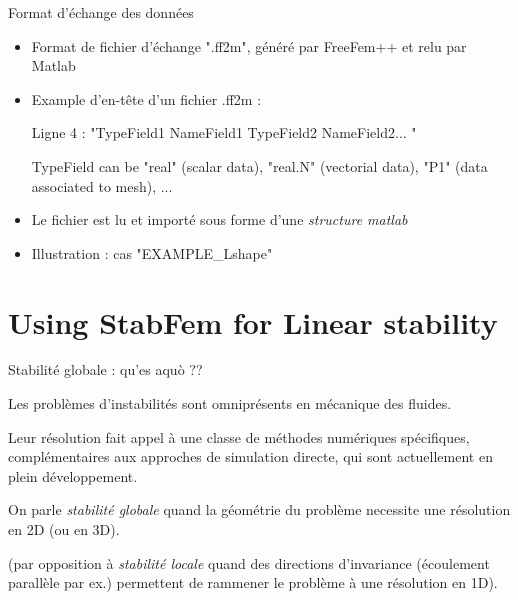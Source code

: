 \documentclass{beamer}
\newcommand{\ssp}{\vspace{.2cm} }
\begin{document}
\begin{frame}{Format d'échange des données}

\begin{itemize}[<+->]


\item Format de fichier d'échange ".ff2m", généré par FreeFem++ et relu par Matlab
 
\item Example d'en-tête d'un fichier .ff2m :


 
Ligne 4 : "TypeField1 NameField1 TypeField2 NameField2... "
  
TypeField can be "real" (scalar data), "real.N" (vectorial data), "P1" (data associated to mesh), ... 

\item Le fichier est lu et importé sous forme d'une {\em structure matlab}   

\item Illustration : cas "EXAMPLE\_Lshape"

\end{itemize}


\end{frame}



\section{Using StabFem for Linear stability }


\begin{frame}{Stabilité globale : qu'es aquò ?? } 


Les problèmes d'instabilités sont omniprésents en mécanique des fluides. 

\ssp

Leur résolution fait appel à une classe de méthodes numériques spécifiques, 
complémentaires aux approches de simulation directe, qui sont actuellement en plein développement. 

\ssp

On parle {\em stabilité globale} quand la géométrie du problème necessite une résolution en 2D (ou en 3D).

\ssp

(par opposition à {\em stabilité locale} quand des directions d'invariance (écoulement parallèle par ex.) permettent de rammener le problème à une résolution en 1D).


\end{frame}
\end{document}
